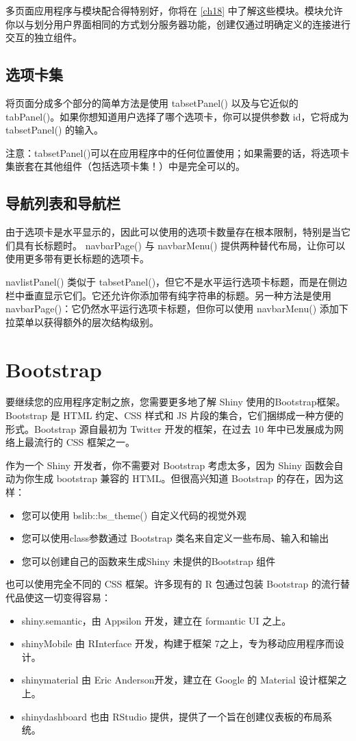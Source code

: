 多页面应用程序与模块配合得特别好，你将在 \autoref{ch18} 中了解这些模块。模块允许你以与划分用户界面相同的方式划分服务器功能，创建仅通过明确定义的连接进行交互的独立组件。
\subsection{选项卡集}
将页面分成多个部分的简单方法是使用 tabsetPanel() 以及与它近似的 tabPanel()。如果你想知道用户选择了哪个选项卡，你可以提供参数 id，它将成为 tabsetPanel() 的输入。

注意：tabsetPanel()可以在应用程序中的任何位置使用；如果需要的话，将选项卡集嵌套在其他组件（包括选项卡集！）中是完全可以的。
\subsection{导航列表和导航栏}
由于选项卡是水平显示的，因此可以使用的选项卡数量存在根本限制，特别是当它们具有长标题时。 navbarPage() 与 navbarMenu() 提供两种替代布局，让你可以使用更多带有更长标题的选项卡。

navlistPanel() 类似于 tabsetPanel()，但它不是水平运行选项卡标题，而是在侧边栏中垂直显示它们。它还允许你添加带有纯字符串的标题。另一种方法是使用 navbarPage()：它仍然水平运行选项卡标题，但你可以使用 navbarMenu() 添加下拉菜单以获得额外的层次结构级别。

\section{Bootstrap}
要继续您的应用程序定制之旅，您需要更多地了解 Shiny 使用的Bootstrap框架。Bootstrap 是 HTML 约定、CSS 样式和 JS 片段的集合，它们捆绑成一种方便的形式。Bootstrap 源自最初为 Twitter 开发的框架，在过去 10 年中已发展成为网络上最流行的 CSS 框架之一。

作为一个 Shiny 开发者，你不需要对 Bootstrap 考虑太多，因为 Shiny 函数会自动为你生成 bootstrap 兼容的 HTML。但很高兴知道 Bootstrap 的存在，因为这样：

\begin{itemize}
    \item 您可以使用 bslib::bs\_theme() 自定义代码的视觉外观
    \item 您可以使用class参数通过 Bootstrap 类名来自定义一些布局、输入和输出
    \item  您可以创建自己的函数来生成Shiny 未提供的Bootstrap 组件
\end{itemize}

也可以使用完全不同的 CSS 框架。许多现有的 R 包通过包装 Bootstrap 的流行替代品使这一切变得容易：
\begin{itemize}
    \item shiny.semantic，由 Appsilon 开发，建立在 formantic UI 之上。
    \item shinyMobile 由 RInterface 开发，构建于框架 7之上，专为移动应用程序而设计。
    \item shinymaterial 由 Eric Anderson开发，建立在 Google 的 Material 设计框架之上。
    \item shinydashboard 也由 RStudio 提供，提供了一个旨在创建仪表板的布局系统。
\end{itemize}


